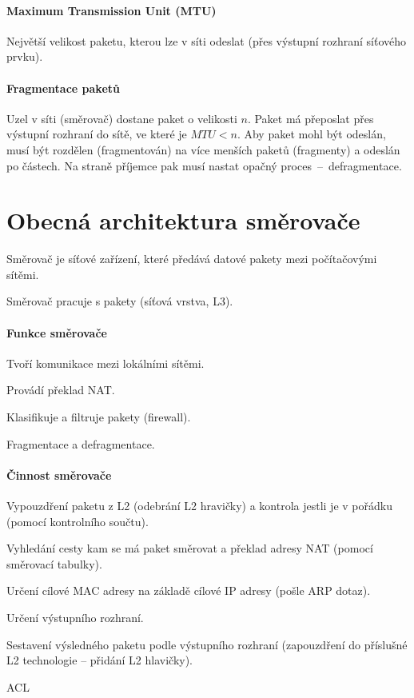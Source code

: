 \paragraph*{Maximum Transmission Unit (MTU)} Největší velikost paketu, kterou lze v síti odeslat (přes výstupní rozhraní síťového prvku).

\paragraph*{Fragmentace paketů} Uzel v síti (směrovač) dostane paket o velikosti $n$. Paket má přeposlat přes výstupní rozhraní do sítě, ve které je $MTU < n$. Aby paket mohl být odeslán, musí být rozdělen (fragmentován) na více menších paketů (fragmenty) a odeslán po částech. Na straně příjemce pak musí nastat opačný proces~--~defragmentace.


\section{Obecná architektura směrovače}

Směrovač je síťové zařízení, které předává datové pakety mezi počítačovými sítěmi. \begin{compactitem}
    \item Směrovač pracuje s pakety (síťová vrstva, L3).
\end{compactitem}

\paragraph*{Funkce směrovače} \begin{compactitem}
    \item Tvoří komunikace mezi lokálními sítěmi.
    \item Provádí překlad NAT.
    \item Klasifikuje a filtruje pakety (firewall).
    \item Fragmentace a defragmentace.
\end{compactitem}

\paragraph*{Činnost směrovače} \begin{compactitem}
    \item Vypouzdření paketu z L2 (odebrání L2 hravičky) a kontrola jestli je v pořádku (pomocí kontrolního součtu).
    \item Vyhledání cesty kam se má paket směrovat a překlad adresy NAT (pomocí směrovací tabulky).
    \item Určení cílové MAC adresy na základě cílové IP adresy (pošle ARP dotaz).
    \item Určení výstupního rozhraní.
    \item Sestavení výsledného paketu podle výstupního rozhraní (zapouzdření do příslušné L2 technologie -- přidání L2 hlavičky).
    \item {} ACL
\end{compactitem}

